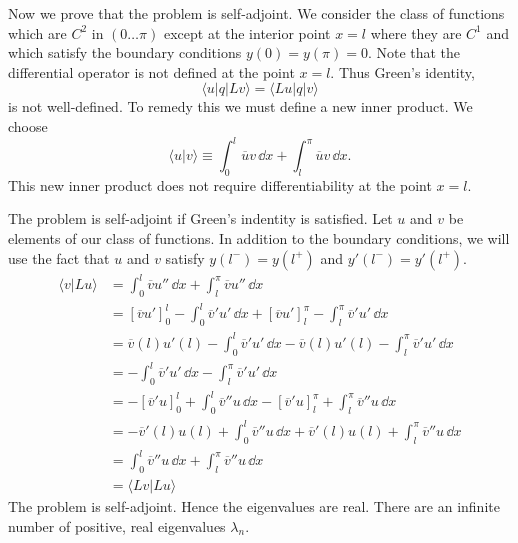 {\begin{Solution}
  Now we prove that the problem is self-adjoint.  We consider the class of 
  functions which are $C^2$ in $(0 \ldots \pi)$ except at the interior point
  $x = l$ where they are $C^1$ and which satisfy the boundary conditions
  $y(0)= y(\pi) = 0$.  Note that the differential operator is not 
  defined at the point $x = l$.  Thus Green's identity, 
  \[
  \langle u | q | L v \rangle = \langle L u | q | v \rangle
  \]
  is not well-defined. To remedy this we must define a new inner product.
  We choose
  \[
  \langle u | v \rangle \equiv \int_0^l \overline{u} v \,\dd x 
  + \int_l^\pi \overline{u} v \,\dd x.
  \]
  This new inner product does not require differentiability at the point $x = l$.

  The problem is self-adjoint if Green's indentity is satisfied.
  Let $u$ and $v$ be elements of our class of functions.
  In addition to the boundary conditions, we will use the fact that 
  $u$ and $v$ satisfy $y(l^-) = y(l^+)$ and $y'(l^-) = y'(l^+)$.
  \begin{align*}
    \langle v | L u \rangle 
    &= \int_0^l \overline{v} u'' \,\dd x + \int_l^\pi \overline{v} u'' \,\dd x \\
    &= \left[ \overline{v} u' \right]_0^l - \int_0^l \overline{v}' u' \,\dd x 
    + \left[ \overline{v} u' \right]_l^\pi - \int_l^\pi \overline{v}' u' \,\dd x \\
    &= \overline{v}(l) u'(l) - \int_0^l \overline{v}' u' \,\dd x 
    - \overline{v}(l) u'(l) - \int_l^\pi \overline{v}' u' \,\dd x \\
    &= - \int_0^l \overline{v}' u' \,\dd x 
    - \int_l^\pi \overline{v}' u' \,\dd x \\
    &= - \left[ \overline{v}' u \right]_0^l + \int_0^l \overline{v}'' u \,\dd x 
    - \left[ \overline{v}' u \right]_l^\pi + \int_l^\pi \overline{v}'' u \,\dd x \\
    &= - \overline{v}'(l) u(l) + \int_0^l \overline{v}'' u \,\dd x 
    + \overline{v}'(l) u(l) + \int_l^\pi \overline{v}'' u \,\dd x \\
    &= \int_0^l \overline{v}'' u \,\dd x + \int_l^\pi \overline{v}'' u \,\dd x \\
    &= \langle L v | L u \rangle 
  \end{align*}
  The problem is self-adjoint.  Hence the eigenvalues are real.
  There are an infinite number of positive, real eigenvalues $\lambda_n$.
\end{Solution}







}
